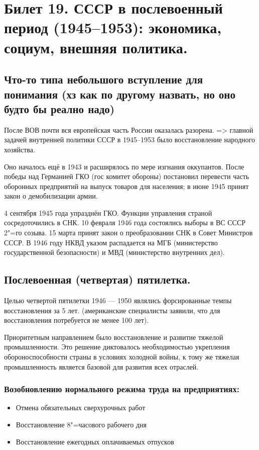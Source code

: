 \section{Билет 19. СССР в послевоенный период (1945--1953): экономика, социум, внешняя политика.}

\subsection{Что-то типа небольшого вступление для понимания (хз как по другому назвать, но оно будто бы реално надо)}

После ВОВ почти вся европейская часть России оказалась разорена. => главной задачей внутренней политики СССР в 1945--1953 было восстановление народного хозяйства.

Оно началось ещё в 1943 и расширялось по мере изгнания оккупантов. После победы над Германией ГКО (гос комитет обороны) постановил перевести часть оборонных предприятий на выпуск товаров для населения; в июне 1945 принят закон о демобилизации армии.

4 сентября 1945 года упразднён ГКО. Функции управления страной сосредоточились в СНК. 10 февраля 1946 года состоялись выборы в ВС СССР 2"=го созыва. 15 марта принят закон о преобразовании СНК в Совет Министров СССР. В 1946 году НКВД указом распадается на МГБ (министерство государственной безопасности) и МВД (министерство внутренних дел). 

\subsection{Послевоенная (четвертая) пятилетка.}

Целью четвертой пятилетки 1946 — 1950 являлись форсированные темпы восстановления за 5 лет. (американские специалисты заявили, что для восстановления потребуется не менее 100 лет). 

Приоритетным направлением было восстановление и развитие тяжелой промышленности. Это решение диктовалось необходимостью укрепления обороноспособности страны в условиях холодной войны, к тому же тяжелая промышленность является базовой для развития всех отраслей. 

\subsubsection{\textbf{Возобновлению нормального режима труда на предприятиях:}}

\begin{itemize}
    \item Отмена обязательных сверхурочных работ 
    \item Восстановление 8"=часового рабочего дня
    \item Восстановление ежегодных оплачиваемых отпусков
\end{itemize}

